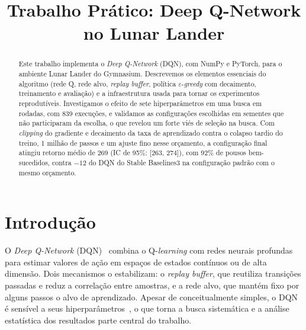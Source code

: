 \documentclass[conference]{IEEEtran}
\begin{document}
\title{Trabalho Prático: Deep Q-Network no Lunar Lander}

\author{
\and
{}
\and
{}
}

\maketitle

\begin{abstract}
Este trabalho implementa o \textit{Deep Q-Network} (DQN), com NumPy e PyTorch, para o ambiente Lunar Lander do Gymnasium. Descrevemos os elementos essenciais do algoritmo (rede Q, rede alvo, \textit{replay buffer}, política $\varepsilon$-\textit{greedy} com decaimento, treinamento e avaliação) e a infraestrutura usada para tornar os experimentos reprodutíveis. Investigamos o efeito de sete hiperparâmetros em uma busca em rodadas, com 839 execuções, e validamos as configurações escolhidas em sementes que não participaram da escolha, o que revelou um forte viés de seleção na busca. Com \textit{clipping} do gradiente e decaimento da taxa de aprendizado contra o colapso tardio do treino, 1 milhão de passos e um ajuste fino nesse orçamento, a configuração final atingiu retorno médio de 269 (IC de 95\%: [263, 274]), com 92\% de pousos bem-sucedidos, contra $-12$ do DQN do Stable Baselines3 na configuração padrão com o mesmo orçamento.
\end{abstract}

\section{Introdução}
O \textit{Deep Q-Network} (DQN)~\cite{mnih2015} combina o Q-\textit{learning} com redes neurais profundas para estimar valores de ação em espaços de estados contínuos ou de alta dimensão. Dois mecanismos o estabilizam: o \textit{replay buffer}, que reutiliza transições passadas e reduz a correlação entre amostras, e a rede alvo, que mantém fixo por alguns passos o alvo de aprendizado. Apesar de conceitualmente simples, o DQN é sensível a seus hiperparâmetros~\cite{henderson2018}, o que torna a busca sistemática e a análise estatística dos resultados parte central do trabalho.
\end{document}
